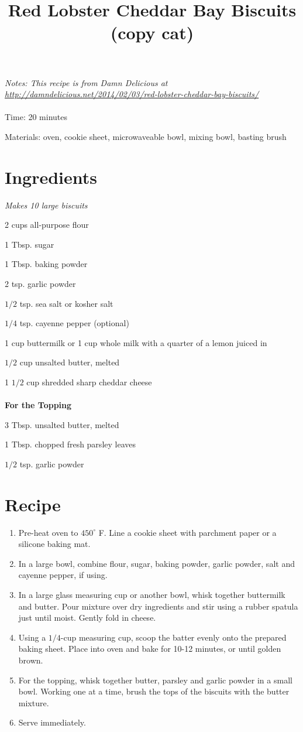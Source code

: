 \documentclass{article}
\title{Red Lobster Cheddar Bay Biscuits (copy cat)}
\begin{document}
\maketitle
{\small
\textit{Notes: This recipe is from Damn Delicious at \url{http://damndelicious.net/2014/02/03/red-lobster-cheddar-bay-biscuits/}}}
\\\\

Time: 20 minutes

Materials: oven, cookie sheet, microwaveable bowl, mixing bowl, basting brush

\section{Ingredients}

\textit{Makes 10 large biscuits}

2 cups all-purpose flour

1 Tbsp. sugar

1 Tbsp. baking powder

2 tsp. garlic powder

$1/2$ tsp. sea salt or kosher salt

$1/4$ tsp. cayenne pepper (optional)

1 cup buttermilk or 1 cup whole milk with a quarter of a lemon juiced in

$1/2$ cup unsalted butter, melted

1 $1/2$ cup shredded sharp cheddar cheese
\\
\\
\textbf{For the Topping}

3 Tbsp. unsalted butter, melted

1 Tbsp. chopped fresh parsley leaves

$1/2$ tsp. garlic powder

\section{Recipe}
\begin{enumerate}
\item{Pre-heat oven to $450^{\circ}$ F. Line a cookie sheet with parchment paper or a silicone baking mat.}
\item{In a large bowl, combine flour, sugar, baking powder, garlic powder, salt and cayenne pepper, if using.}
\item{In a large glass measuring cup or another bowl, whisk together buttermilk and butter. Pour mixture over dry ingredients and stir using a rubber spatula just until moist. Gently fold in cheese.}
\item{Using a $1/4$-cup measuring cup, scoop the batter evenly onto the prepared baking sheet. Place into oven and bake for 10-12 minutes, or until golden brown.}
\item{For the topping, whisk together butter, parsley and garlic powder in a small bowl. Working one at a time, brush the tops of the biscuits with the butter mixture.}
\item{Serve immediately.}
\end{enumerate}
\end{document}
